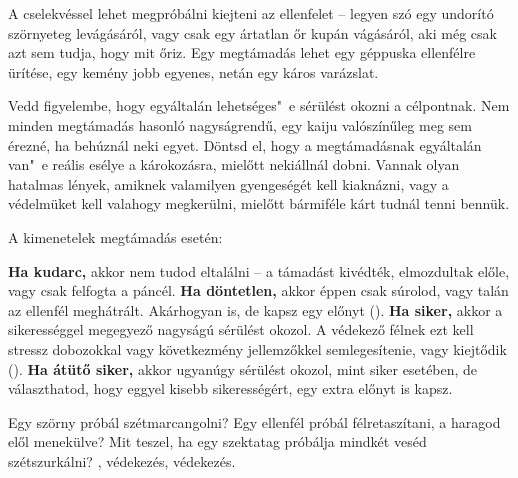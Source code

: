\label{Megtámadás}

A  cselekvéssel lehet megpróbálni kiejteni az ellenfelet -- legyen szó egy undorító szörnyeteg levágásáról, vagy csak egy ártatlan őr kupán vágásáról, aki még csak azt sem tudja, hogy mit őriz. Egy megtámadás lehet egy géppuska ellenfélre ürítése, egy kemény jobb egyenes, netán egy káros varázslat.

Vedd figyelembe, hogy egyáltalán lehetséges"~e sérülést okozni a célpontnak. Nem minden megtámadás hasonló nagyságrendű, egy kaiju valószínűleg meg sem érezné, ha behúznál neki egyet. Döntsd el, hogy a megtámadásnak egyáltalán van"~e reális esélye a károkozásra, mielőtt nekiállnál dobni. Vannak olyan hatalmas lények, amiknek valamilyen gyengeségét kell kiaknázni, vagy a védelmüket kell valahogy megkerülni, mielőtt bármiféle kárt tudnál tenni bennük.

A kimenetelek megtámadás esetén:

\begin{itemize}
    \failureitem \textbf{Ha kudarc,} akkor nem tudod eltalálni -- a támadást kivédték, elmozdultak előle, vagy csak felfogta a páncél.
    \tieitem \textbf{Ha döntetlen,} akkor éppen csak súrolod, vagy talán az ellenfél meghátrált. Akárhogyan is, de kapsz egy előnyt ().
    \successitem \textbf{Ha siker,} akkor a sikerességgel megegyező nagyságú sérülést okozol. A védekező félnek ezt kell stressz dobozokkal vagy következmény jellemzőkkel semlegesítenie, vagy kiejtődik ().
    \successwithstyleitem \textbf{Ha átütő siker,} akkor ugyanúgy sérülést okozol, mint siker esetében, de választhatod, hogy eggyel kisebb sikerességért, egy extra előnyt is kapsz.
\end{itemize}


\newpage

\label{Védekezés}

Egy szörny próbál szétmarcangolni? Egy ellenfél próbál félretaszítani, a haragod elől menekülve? Mit teszel, ha egy szektatag próbálja mindkét veséd szétszurkálni? , védekezés, védekezés.

